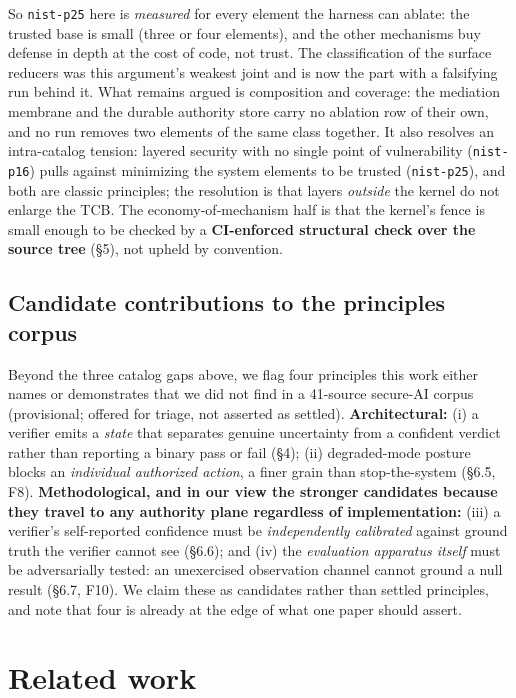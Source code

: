 \documentclass[11pt]{article}
\begin{document}
So \texttt{nist-p25} here is \emph{measured} for every element the harness can ablate: the trusted
base is small (three or four elements), and the other mechanisms buy defense in depth at the cost of
code, not trust. The classification of the surface reducers was this argument's weakest joint and is
now the part with a falsifying run behind it. What remains argued is composition and coverage: the
mediation membrane and the durable authority store carry no ablation row of their own, and no run
removes two elements of the same class together. It also resolves an intra-catalog tension: layered security with no single point of vulnerability (\texttt{nist-p16}) pulls against minimizing the system elements to be trusted (\texttt{nist-p25}), and both are classic principles; the resolution is that layers
\emph{outside} the kernel do not enlarge the TCB. The economy-of-mechanism half is that the kernel's
fence is small enough to be checked by a \textbf{CI-enforced structural check over the source tree}
(\S5), not upheld by convention.

\subsection{Candidate contributions to the principles corpus}\label{candidate-contributions-to-the-principles-corpus}

Beyond the three catalog gaps above, we flag four principles this work either names or
demonstrates that we did not find in a 41-source secure-AI corpus (provisional; offered for
triage, not asserted as settled). \textbf{Architectural:} (i) a verifier emits a \emph{state} that separates genuine uncertainty from a confident verdict rather than reporting a binary pass or fail (\S4); (ii)
degraded-mode posture blocks an \emph{individual authorized action}, a finer grain than
stop-the-system (\S6.5, F8). \textbf{Methodological, and in our view the stronger candidates because
they travel to any authority plane regardless of implementation:} (iii) a verifier's
self-reported confidence must be \emph{independently calibrated} against ground truth the verifier
cannot see (\S6.6); and (iv) the \emph{evaluation apparatus itself} must be adversarially tested: an
unexercised observation channel cannot ground a null result (\S6.7, F10). We claim these as
candidates rather than settled principles, and note that four is already at the edge of what one
paper should assert.

\section{Related work}\label{related-work}
\end{document}
